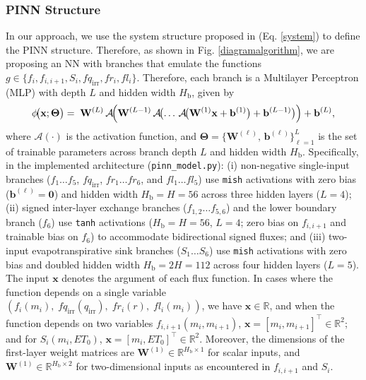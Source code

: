 \documentclass[pdflatex,sn-nature]{sn-jnl}%
\theoremstyle{thmstyleone}%
\theoremstyle{thmstyletwo}%
\theoremstyle{thmstylethree}%
\begin{document}
\subsubsection{PINN Structure}
In our approach, we use the system structure proposed in (Eq. \eqref{system}) to define the PINN structure. Therefore, as shown in Fig. \ref{diagramalgorithm}, we are proposing an NN with branches that emulate the functions \( g \in \{f_i, f_{i,i+1}, S_i, fq_{\mathrm{irr}}, fr_i, fl_i\} \). Therefore, each branch is a Multilayer Perceptron (MLP) with depth \( L \) and hidden width \( H_{\mathrm{b}} \), given by
\begin{equation}
\phi\!\bigl(\mathbf{x}; \boldsymbol{\Theta}\bigr)
  =\;
  \mathbf{W}^{(L)}
  \,\mathcal{A}\!\Bigl(
     \mathbf{W}^{(L-1)}
     \,\mathcal{A}\!\bigl(
        \dots
        \,\mathcal{A}\!\bigl(
           \mathbf{W}^{(1)}\mathbf{x}
           +\mathbf{b}^{(1)}
        \bigr)
        +\mathbf{b}^{(L-1)}
     \bigr)
  \Bigr)
  +\mathbf{b}^{(L)},
\label{eq:mlp}
\end{equation}
where \(\mathcal{A}(\cdot)\) is the activation function, and \(\displaystyle \boldsymbol{\Theta} = \{\mathbf{W}^{(\ell)},\,\mathbf{b}^{(\ell)}\}_{\ell=1}^L\) is the set of trainable parameters across branch depth \(L\) and hidden width \(H_{\mathrm{b}}\). Specifically, in the implemented architecture (\texttt{pinn\_model.py}): (i) non-negative single-input branches (\(f_1\dots f_5\), \(fq_{\mathrm{irr}}\), \(fr_1\dots fr_6\), and \(fl_1\dots fl_5\)) use \texttt{mish} activations with zero bias (\(\mathbf{b}^{(\ell)}=\mathbf{0}\)) and hidden width \(H_{\mathrm{b}}=H=56\) across three hidden layers (\(L=4\)); (ii) signed inter-layer exchange branches (\(f_{1,2}\dots f_{5,6}\)) and the lower boundary branch (\(f_6\)) use \texttt{tanh} activations (\(H_{\mathrm{b}}=H=56\), \(L=4\); zero bias on \(f_{i,i+1}\) and trainable bias on \(f_6\)) to accommodate bidirectional signed fluxes; and (iii) two-input evapotranspirative sink branches (\(S_1\dots S_6\)) use \texttt{mish} activations with zero bias and doubled hidden width \(H_{\mathrm{b}}=2H=112\) across four hidden layers (\(L=5\)). The input \(\mathbf{x}\) denotes the argument of each flux function.
In cases where the function depends on a single variable $\left(f_i(m_i),\;fq_{\mathrm{irr}}(q_{\mathrm{irr}}),\;fr_i(r),\;fl_i(m_i)\right)$, we have \(\mathbf{x}\in\mathbb{R}\), and when the function depends on two variables \(f_{i,i+1}(m_i,m_{i+1})\), \(\displaystyle \mathbf{x}=[m_i,m_{i+1}]^\top\in\mathbb{R}^2\); and for \(S_i(m_i,ET_0)\), \(\displaystyle \mathbf{x}=[m_i,ET_0]^\top\in\mathbb{R}^2\). Moreover, the dimensions of the first-layer weight matrices are \(\mathbf{W}^{(1)}\in\mathbb{R}^{H_{\mathrm{b}}\times1}\) for scalar inputs, and \(\mathbf{W}^{(1)}\in\mathbb{R}^{H_{\mathrm{b}}\times2}\) for two-dimensional inputs as encountered in \(f_{i,i+1}\) and \(S_i\).
\end{document}
